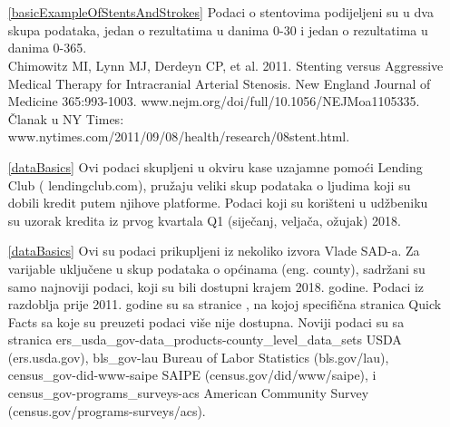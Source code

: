 \newcommand{\seedataappendix}[1]{Ovaj skup podataka opisan je u prilogu~\ref{#1}.}
\newcommand{\seedataappendixplural}[1]{Ovi skupovi podataka opisani su u prilogu~\ref{#1}.}
\newcommand{\madeup}{Ovaj primjer je izmišljen.}%


\section{}
\label{ch_intro_to_data_data}

\begin{itemize}
	\setlength{\itemsep}{0mm}
	\item[\ref{basicExampleOfStentsAndStrokes}]
	Podaci o stentovima podijeljeni su u dva skupa podataka,
	jedan o rezultatima u danima 0-30 i jedan o rezultatima u danima 0-365. \\
	Chimowitz MI, Lynn MJ, Derdeyn CP, et al. 2011.
	Stenting versus Aggressive Medical Therapy for
	Intracranial Arterial Stenosis.
	New England Journal of Medicine 365:993-1003.
	{www.nejm.org/doi/full/10.1056/NEJMoa1105335}. \\
	Članak u NY Times:
	{www.nytimes.com/2011/09/08/health/research/08stent.html}.

	\item[\ref{dataBasics}]
	Ovi podaci skupljeni u okviru kase uzajamne pomoći Lending Club
	(
	{lendingclub.com}),
	pružaju veliki skup podataka o ljudima koji su
	dobili kredit putem njihove platforme.
	Podaci koji su korišteni u udžbeniku su uzorak kredita
	iz prvog kvartala Q1 (siječanj, veljača, ožujak) 2018.
	\item[\ref{dataBasics}]
	Ovi su podaci prikupljeni iz nekoliko izvora Vlade SAD-a.
	Za varijable uključene u skup podataka o općinama (eng.
	county), sadržani su samo najnoviji podaci,
	koji su bili dostupni krajem 2018. godine.
	Podaci iz razdoblja prije 2011. godine su sa stranice
	,
	na kojoj specifična stranica Quick Facts sa koje su preuzeti podaci
	više nije dostupna.
	Noviji podaci su sa stranica
	\oiRedirect
	{ers_usda_gov-data_products-county_level_data_sets}
	{USDA (ers.usda.gov)},
	\oiRedirect
	{bls_gov-lau}
	{Bureau of Labor Statistics (bls.gov/lau)},
	\oiRedirect
	{census_gov-did-www-saipe}
	{SAIPE (census.gov/did/www/saipe)},
	i
	\oiRedirect
	{census_gov-programs_surveys-acs}
	{American Community Survey
		(census.gov/programs-surveys/acs)}.


\end{itemize}
